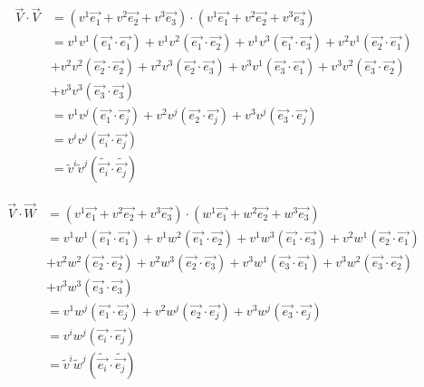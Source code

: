 \documentclass{article}
\begin{document}
	\begin{align*}
		\overrightarrow{V}\cdot\overrightarrow{V} &= (v^{1}\overrightarrow{e_{1}} + v^{2}\overrightarrow{e_{2}} + v^{3}\overrightarrow{e_{3}})\cdot (v^{1}\overrightarrow{e_{1}} + v^{2}\overrightarrow{e_{2}} + v^{3}\overrightarrow{e_{3}})\\
		&= v^{1}v^{1}(\overrightarrow{e_{1}}\cdot \overrightarrow{e_{1}}) + v^{1}v^{2}(\overrightarrow{e_{1}}\cdot \overrightarrow{e_{2}}) + v^{1}v^{3}(\overrightarrow{e_{1}}\cdot \overrightarrow{e_{3}}) +v^{2}v^{1}(\overrightarrow{e_{2}}\cdot \overrightarrow{e_{1}})\\
		&+ v^{2}v^{2}(\overrightarrow{e_{2}}\cdot \overrightarrow{e_{2}}) + v^{2}v^{3}(\overrightarrow{e_{2}}\cdot \overrightarrow{e_{3}})+ v^{3}v^{1}(\overrightarrow{e_{3}}\cdot \overrightarrow{e_{1}}) + v^{3}v^{2}(\overrightarrow{e_{3}}\cdot \overrightarrow{e_{2}})\\ 
		& + v^{3}v^{3}(\overrightarrow{e_{3}}\cdot \overrightarrow{e_{3}})\\
		&= v^{1}v^{j}(\overrightarrow{e_{1}}\cdot \overrightarrow{e_{j}}) + 
		v^{2}v^{j}(\overrightarrow{e_{2}}\cdot \overrightarrow{e_{j}}) + v^{3}v^{j}(\overrightarrow{e_{3}}\cdot \overrightarrow{e_{j}})\\
		&= v^{i}v^{j}(\overrightarrow{e_{i}}\cdot \overrightarrow{e_{j}})\\
		&=\widetilde{v}^{i}\widetilde{v}^{j}(\widetilde{\overrightarrow{e_{i}}}\cdot \widetilde{\overrightarrow{e_{j}}})
	\end{align*}

	\begin{align*}
		\overrightarrow{V}\cdot\overrightarrow{W} &= (v^{1}\overrightarrow{e_{1}} + v^{2}\overrightarrow{e_{2}} + v^{3}\overrightarrow{e_{3}})\cdot (w^{1}\overrightarrow{e_{1}} + w^{2}\overrightarrow{e_{2}} + w^{3}\overrightarrow{e_{3}})\\
		&= v^{1}w^{1}(\overrightarrow{e_{1}}\cdot \overrightarrow{e_{1}}) + v^{1}w^{2}(\overrightarrow{e_{1}}\cdot \overrightarrow{e_{2}}) + v^{1}w^{3}(\overrightarrow{e_{1}}\cdot \overrightarrow{e_{3}}) +v^{2}w^{1}(\overrightarrow{e_{2}}\cdot \overrightarrow{e_{1}})\\
		&+ v^{2}w^{2}(\overrightarrow{e_{2}}\cdot \overrightarrow{e_{2}}) + v^{2}w^{3}(\overrightarrow{e_{2}}\cdot \overrightarrow{e_{3}})+ v^{3}w^{1}(\overrightarrow{e_{3}}\cdot \overrightarrow{e_{1}}) + v^{3}w^{2}(\overrightarrow{e_{3}}\cdot \overrightarrow{e_{2}})\\ 
		& + v^{3}w^{3}(\overrightarrow{e_{3}}\cdot \overrightarrow{e_{3}})\\
		&= v^{1}w^{j}(\overrightarrow{e_{1}}\cdot \overrightarrow{e_{j}}) + 
		v^{2}w^{j}(\overrightarrow{e_{2}}\cdot \overrightarrow{e_{j}}) + v^{3}w^{j}(\overrightarrow{e_{3}}\cdot \overrightarrow{e_{j}})\\
		&= v^{i}w^{j}(\overrightarrow{e_{i}}\cdot \overrightarrow{e_{j}})\\
		&=\widetilde{v}^{i}\widetilde{w}^{j}(\widetilde{\overrightarrow{e_{i}}}\cdot \widetilde{\overrightarrow{e_{j}}}) 
	\end{align*}
	
\end{document}
